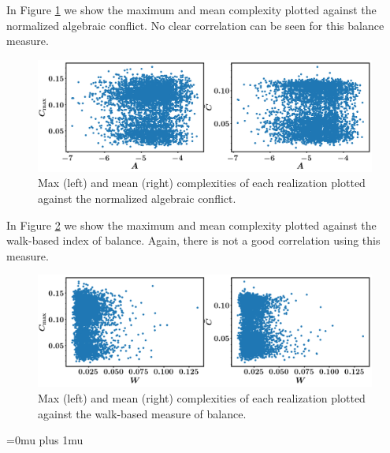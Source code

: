 \documentclass[10pt]{article}
\begin{document}
In Figure \ref{C_vs_A} we show the maximum and mean complexity plotted against the normalized algebraic conflict.  No clear correlation can be seen for this balance measure.

\begin{figure}[H]
	\centering
\includegraphics[scale=0.35]{../figs/C_vs_A.png}
	\caption{Max (left) and mean (right) complexities of each realization plotted against the normalized algebraic conflict. \label{C_vs_A}}
\end{figure}


In Figure \ref{C_vs_W} we show the maximum and mean complexity plotted against the walk-based index of balance.  Again, there is not a good correlation using this measure.

\begin{figure}[H]
	\centering
\includegraphics[scale=0.35]{../figs/C_vs_W.png}
	\caption{Max (left) and mean (right) complexities of each realization plotted against the walk-based measure of balance. \label{C_vs_W}}
\end{figure}

\Urlmuskip=0mu plus 1mu\relax


\end{document}
